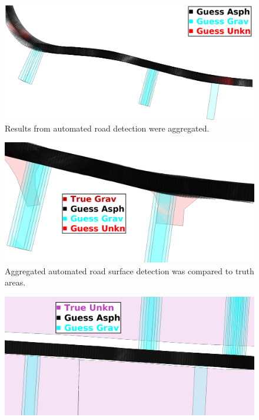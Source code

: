 \documentclass[numbered,pdftex]{ohio-etd}
\begin{document}
{{{		\begin{figure}[H]
			\centering
			\includegraphics[width=0.95\linewidth]{Defense_Images/agreggated_auto_guess}
			\caption[Aggregated Automated Road Surface Detection]{Results from automated road detection were aggregated.}
			\label{fig:agreggated_auto_guess}
		\end{figure}
		
		\begin{figure}[H]
			\centering
			\includegraphics[width=0.95\linewidth]{Defense_Images/guess_grav_intersect}
			\caption[Aggregated Automated Road Surface Detection]{Aggregated automated road surface detection was compared to truth areas. }
			\label{fig:guess_grav_intersect}
		\end{figure}
		
		\begin{figure}[H]
			\centering
			\includegraphics[width=0.95\linewidth]{Defense_Images/6range_guess_unkn_misclass}
			\caption[Automated Road Surface False Positive]{}
			\label{fig:6range_guess_unkn_misclass}
		\end{figure}
		
}}}
\end{document}
